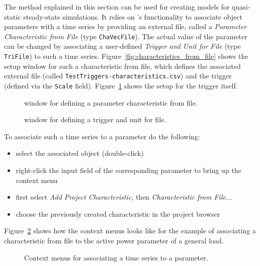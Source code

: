The method explained in this section can be used for creating models for quasi-static steady-state simulations.
It relies on \pf's functionality to associate object parameters with a time series by providing an external file, called a \emph{Parameter Characteristic from File} (type \texttt{ChaVecFile}).
The actual value of the parameter can be changed by associating a user-defined \emph{Trigger and Unit for File} (type \texttt{TriFile}) to such a time series.
Figure~\ref{fig:characteristics_from_file} shows the setup window for such a characteristic from file, which defines the associated external file (called \texttt{TestTriggers-characteristics.csv}) and the trigger (defined via the \texttt{Scale} field).
Figure~\ref{fig:trigger_for_file} shows the setup for the trigger itself.
\begin{figure}[h!]
\vspace*{-2mm}
\caption{\pf window for defining a parameter characteristic from file.}
\label{fig:characteristics_from_file}
\vspace*{1em}
\vspace*{-2mm}
\caption{\pf window for defining a trigger and unit for file.}
\label{fig:trigger_for_file}
\end{figure}


To associate such a time series to a parameter do the following:
\begin{itemize}
  \item select the associated object (double-click)
  \item right-click the input field of the corresponding parameter to bring up the context menu
  \item first select \emph{Add Project Characteristic}, then \emph{Characteristic from File...}
  \item choose the previously created characteristic in the project browser
\end{itemize} 
Figure~\ref{fig:add_characteristics_from_file} shows how the context menus looks like for the example of associating a characteristic from file to the active power parameter of a general load.

\begin{figure}[h!]
\vspace*{2em}
\caption{Context menus for associating a time series to a parameter.}
\label{fig:add_characteristics_from_file}
\end{figure}

